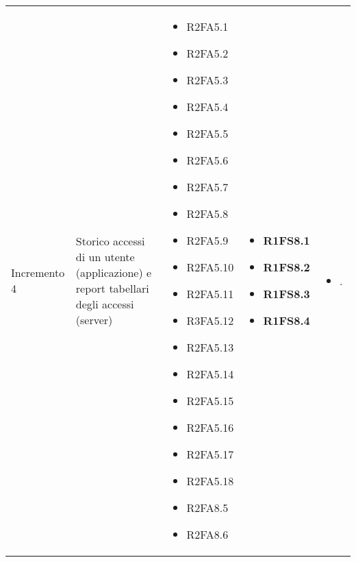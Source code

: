{\begin{longtable}{C{2.5cm} C{3.2cm} C{2.8cm} C{2.8cm} C{2.8cm}}
Incremento 4 & Storico accessi di un utente (applicazione) e report tabellari degli accessi (server) & \begin{itemize}
    \item[ ] R2FA5.1
    \item[ ] R2FA5.2
    \item[ ] R2FA5.3
    \item[ ] R2FA5.4
    \item[ ] R2FA5.5
    \item[ ] R2FA5.6
    \item[ ] R2FA5.7
    \item[ ] R2FA5.8
    \item[ ] R2FA5.9
    \item[ ] R2FA5.10
    \item[ ] R2FA5.11
    \item[ ] R3FA5.12
    \item[ ] R2FA5.13
    \item[ ] R2FA5.14
    \item[ ] R2FA5.15
    \item[ ] R2FA5.16
    \item[ ] R2FA5.17
    \item[ ] R2FA5.18
    \item[ ] R2FA8.5
    \item[ ] R2FA8.6
\end{itemize} & \begin{itemize} 
    \item[ ] \textbf{R1FS8.1}
    \item[ ] \textbf{R1FS8.2}
    \item[ ] \textbf{R1FS8.3}
    \item[ ] \textbf{R1FS8.4}  
\end{itemize} & \begin{itemize} 
    \item[ ] .        
\end{itemize}\\


\end{longtable}}

